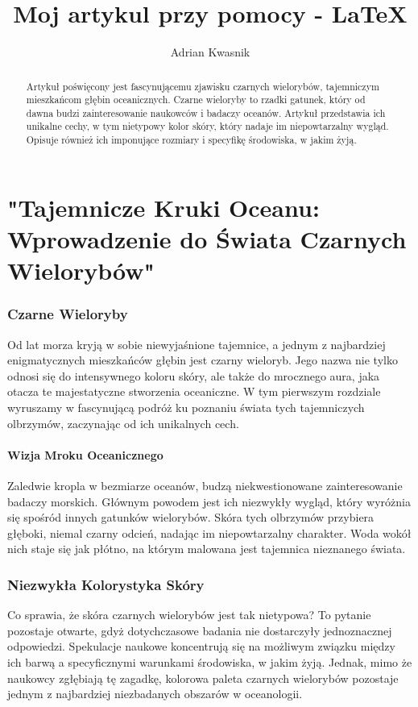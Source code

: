 \documentclass{article}
\title{Moj artykul przy pomocy - \LaTeX}
\author{Adrian Kwasnik}
\begin{document}
\maketitle

\begin{abstract}
    Artykuł poświęcony jest fascynującemu zjawisku czarnych wielorybów, tajemniczym mieszkańcom głębin oceanicznych. Czarne wieloryby to rzadki gatunek, który od dawna budzi zainteresowanie naukowców i badaczy oceanów. Artykuł przedstawia ich unikalne cechy, w tym nietypowy kolor skóry, który nadaje im niepowtarzalny wygląd. Opisuje również ich imponujące rozmiary i specyfikę środowiska, w jakim żyją.
\end{abstract}

\part{"Tajemnicze Kruki Oceanu: Wprowadzenie do Świata Czarnych Wielorybów"}
\section{Czarne Wieloryby}\label{marker}
Od lat morza kryją w sobie niewyjaśnione tajemnice, a jednym z najbardziej enigmatycznych mieszkańców głębin jest czarny wieloryb. Jego nazwa nie tylko odnosi się do intensywnego koloru skóry, ale także do mrocznego aura, jaka otacza te majestatyczne stworzenia oceaniczne. W tym pierwszym rozdziale wyruszamy w fascynującą podróż ku poznaniu świata tych tajemniczych olbrzymów, zaczynając od ich unikalnych cech.
\subsection{Wizja Mroku Oceanicznego}
Zaledwie kropla w bezmiarze oceanów, budzą niekwestionowane zainteresowanie badaczy morskich. Głównym powodem jest ich niezwykły wygląd, który wyróżnia się spośród innych gatunków wielorybów. Skóra tych olbrzymów przybiera głęboki, niemal czarny odcień, nadając im niepowtarzalny charakter. Woda wokół nich staje się jak płótno, na którym malowana jest tajemnica nieznanego świata.
\newpage
\section{Niezwykła Kolorystyka Skóry}
Co sprawia, że skóra czarnych wielorybów jest tak nietypowa? To pytanie pozostaje otwarte, gdyż dotychczasowe badania nie dostarczyły jednoznacznej odpowiedzi. Spekulacje naukowe koncentrują się na możliwym związku między ich barwą a specyficznymi warunkami środowiska, w jakim żyją. Jednak, mimo że naukowcy zgłębiają tę zagadkę, kolorowa paleta czarnych wielorybów pozostaje jednym z najbardziej niezbadanych obszarów w oceanologii.
\end{document}
